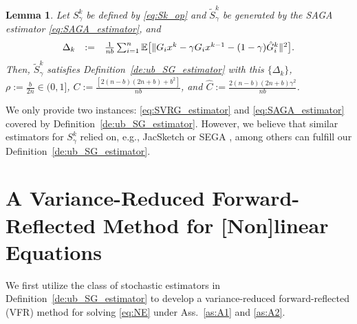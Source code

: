 \documentclass{article}
\newcommand{\sets}[1]{\{#1\}}
\newcommand{\norms}[1]{\Vert#1\Vert}
\newcommand{\Expk}[1]{\mathbb{E}\big[#1\big]}
\newcommand{\beforesec}{\vspace{-1.5ex}}
\newcommand{\aftersec}{\vspace{-1.25ex}}
\newcommand{\beforesubsec}{\vspace{-1.5ex}}
\theoremstyle{plain}
\newtheorem{lemma}[theorem]{Lemma}
\theoremstyle{definition}
\theoremstyle{remark}
\begin{document}
\begin{lemma}\label{le:SAGA_estimator}
Let $S^k_{\gamma}$ be defined by \eqref{eq:Sk_op} and $\widetilde{S}_{\gamma}^k$ be generated by the SAGA estimator \eqref{eq:SAGA_estimator}, and  
\vspace{-0.75ex}
\begin{equation*} 
\begin{array}{lcl}
 \Delta_k &:= &  \frac{1}{nb} \sum_{i=1}^n \Expk{ \norms{ G_ix^k - \gamma G_ix^{k-1} - (1-\gamma) \hat{G}_{i}^k }^2 }.
\end{array}
\vspace{-0.75ex}
\end{equation*}
Then,  $\widetilde{S}_{\gamma}^k$  satisfies Definition~\ref{de:ub_SG_estimator} with this $\sets{\Delta_k}$, $\rho := \frac{b}{2n} \in (0, 1]$, $C :=  \frac{[ 2(n - b)(2n+b) + b^2] }{ n b}$, and $\hat{C} := \frac{2(n - b)(2n+b) \gamma^2}{ nb}$.
\end{lemma}

We only provide two instances: \eqref{eq:SVRG_estimator} and \eqref{eq:SAGA_estimator} covered by Definition~\ref{de:ub_SG_estimator}.
However, we believe that similar estimators for $S_{\gamma}^k$ relied on, e.g., JacSketch \citep{gower2021stochastic} or SEGA \citep{hanzely2018sega}, among others can fulfill our Definition~\ref{de:ub_SG_estimator}.

\beforesec
\section{A Variance-Reduced Forward-Reflected Method for [Non]linear Equations}\label{sec:VROG4NE}
\aftersec
\vspace{0.5ex}
We first utilize the class of stochastic estimators in Definition~\ref{de:ub_SG_estimator} to develop a variance-reduced forward-reflected (VFR) method for solving \eqref{eq:NE} under Ass.~\ref{as:A1} and \ref{as:A2}.

\beforesubsec
\end{document}
